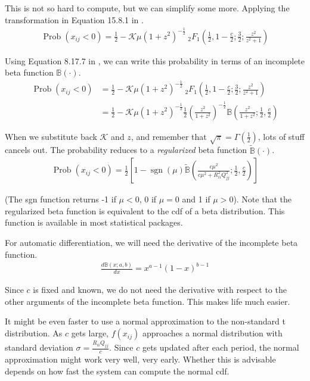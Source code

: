 \documentclass[letter,11pt]{article}
\DeclareMathOperator\sgn{sgn}
\DeclareMathOperator\Prob{Prob}
\newcommand{\K}{\mathcal{K}}
\begin{document}
This is not so hard to compute, but we can simplify some more.  Applying the transformation in Equation 15.8.1 in \citet{NIST2010}.
\begin{align}
  \label{eq:6}
  \Prob(x_{ij}<0) =\frac{1}{2}-\K\mu \left(1+z^2\right)^{-\frac{1}{2}}~_2F_1\left(\frac{1}{2},1-\frac{c}{2};\frac{3}{2};\frac{z^2}{z^2+1}\right)
\end{align}

Using Equation 8.17.7 in \citet{NIST2010}, we can write this probability in
terms of an incomplete beta function $\mathbb{B}(\cdot)$.
\begin{align}
  \label{eq:7}
  \Prob(x_{ij}<0) &=\frac{1}{2}-\K\mu
  \left(1+z^2\right)^{-\frac{1}{2}}~_2F_1\left(\frac{1}{2},1-\frac{c}{2};\frac{3}{2};\frac{z^2}{z^2+1}\right)\\
&=\frac{1}{2}-\K\mu \left(1+z^2\right)^{-\frac{1}{2}}
\frac{1}{2}\left(\frac{z^2}{1+z^2}\right)^{-\frac{1}{2}}\mathbb{B}\left(\frac{z^2}{1+z^2};\frac{1}{2},\frac{c}{2}\right)
\end{align}

When we substitute back $\K$ and $z$, and remember that
$\sqrt{\pi}=\Gamma(\frac{1}{2})$, lots of stuff cancels out.  The
probability reduces to a \emph{regularized}
beta function $\widetilde{\mathbb{B}}(\cdot)$.
\begin{align}
  \label{eq:8}
  \Prob(x_{ij}<0)=\frac{1}{2}\left[1-\sgn(\mu)\widetilde{\mathbb{B}}\left(\frac{c\mu^2}{c\mu^2+R_{ii}^2Q_{jj}^2};\frac{1}{2},\frac{c}{2}\right)\right]
\end{align}

(The sgn function returns -1 if $\mu<0$, 0 if $\mu=0$ and 1 if $\mu> 0$).  Note that the regularized beta function is equivalent to the cdf of a
beta distribution.  This function is available in most statistical packages.

For automatic differentiation, we will need the derivative of the
incomplete beta function.
\begin{align}
  \label{eq:9}
  \frac{d\mathbb{B}(x;a,b)}{dx}=x^{a-1}(1-x)^{b-1}
\end{align}

Since $c$ is fixed and known, we do not need the derivative with
respect to the other arguments of the incomplete beta function.  This
makes life much easier.

It might be even faster to use a normal approximation to the
non-standard t distribution. As $c$ gets large, $f(x_{ij})$ approaches
a normal distribution with standard deviation
$\sigma=\displaystyle\frac{R_{ii}Q_{jj}}{c}$.  Since $c$ gets updated
after each period, the normal approximation might work very well, very
early.  Whether this is advisable depends on how fast the system can
compute the normal cdf.
\end{document}
